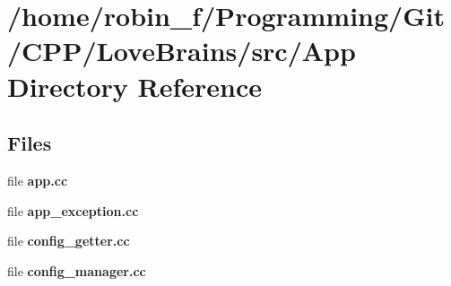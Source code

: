 \section{/home/robin\+\_\+f/\+Programming/\+Git/\+C\+P\+P/\+Love\+Brains/src/\+App Directory Reference}
\label{dir_dc1c5beaffdf9d3ea3f3849089c7ef93}
\subsection*{Files}
\begin{DoxyCompactItemize}
\item 
file {\bfseries app.\+cc}
\item 
file {\bfseries app\+\_\+exception.\+cc}
\item 
file {\bfseries config\+\_\+getter.\+cc}
\item 
file {\bfseries config\+\_\+manager.\+cc}
\end{DoxyCompactItemize}
